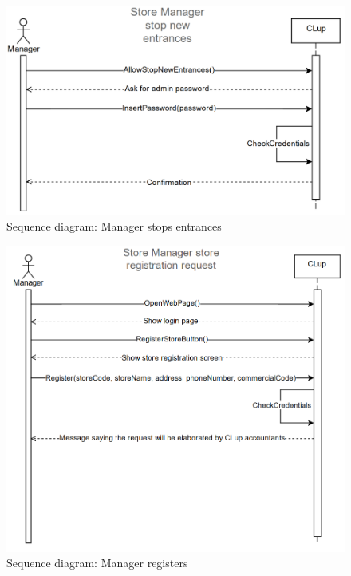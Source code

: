 \begin{figure}[H]
	\includegraphics[width=\linewidth]{../Diagrams/StopEntrances.png}
	\caption{Sequence diagram: Manager stops entrances}
	\label{fig:StopEntr}
\end{figure} 

\begin{figure}[H]
	\includegraphics[width=\linewidth]{../Diagrams/StoreRegistration.png}
	\caption{Sequence diagram: Manager registers}
	\label{fig:StoreReg}
\end{figure} 

